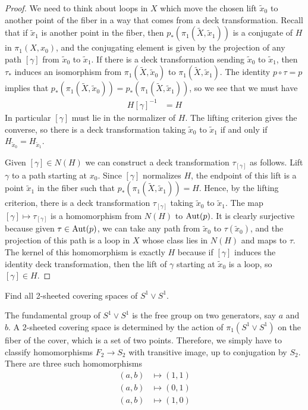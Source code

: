 \documentclass[12pt]{article}
\begin{document}
\begin{proof}
    We need to think about loops in $X$ which move the chosen lift $\widetilde x_0$ to another point of the fiber in a way that comes from a deck transformation. Recall that if $\widetilde x_1$ is another point in the fiber, then $p_*(\pi_1(\tilde X,\tilde x_1))$ is a conjugate of $H$ in $\pi_1(X,x_0)$, and the conjugating element is given by the projection of any path $[\gamma]$ from $\widetilde x_0$ to $\widetilde x_1$. If there is a deck transformation sending $\widetilde x_0$ to $\widetilde x_1$, then $\tau_*$ induces an isomorphism from $\pi_1(\tilde X,\tilde x_0)$ to $\pi_1(\tilde X,\tilde x_1)$. The identity $p\circ \tau = p$ implies that $p_*(\pi_1(\tilde X,\tilde x_0))=p_*(\pi_1(\tilde X,\tilde x_1))$, so we see that we must have \begin{align*}
        [\gamma]H[\gamma]^{-1} & = H
    \end{align*} In particular $[\gamma]$ must lie in the normalizer of $H$. The lifting criterion gives the converse, so there is a deck transformation taking $\widetilde x_0$ to $\widetilde x_1$ if and only if
    $H_{\widetilde x_0}=H_{\widetilde x_1}$.


    Given $[\gamma]\in N(H)$ we can construct a deck transformation $\tau_{[\gamma]}$ as follows. Lift $\gamma$ to a path starting at $x_0$. Since $[\gamma]$ normalizes $H$, the endpoint of this lift is a point $\widetilde x_1$ in the fiber such that $p_*(\pi_1(\tilde X,\tilde x_1))=H$. Hence, by the lifting criterion, there is a deck transformation $\tau_{[\gamma]}$ taking $\widetilde x_0$ to $\widetilde x_1$. The map $[\gamma]\mapsto \tau_{[\gamma]}$ is a homomorphism from $N(H)$ to $\operatorname{Aut}(p)$. It is clearly surjective because given $\tau \in \operatorname{Aut}(p)$, we can take any path from $\widetilde x_0$ to $\tau(\widetilde x_0)$, and the projection of this path is a loop in $X$ whose class lies in $N(H)$ and maps to $\tau$. The kernel of this homomorphism is exactly $H$ because if $[\gamma]$ induces the identity deck transformation, then the lift of $\gamma$ starting at $\widetilde x_0$ is a loop, so $[\gamma]\in H$.
\end{proof}

\begin{exercise}
    Find all 2-sheeted covering spaces of $S^1\vee S^1$.
\end{exercise}

\begin{solution}
    The fundamental group of $S^1\vee S^1$ is the free group on two generators, say $a$ and $b$. A 2-sheeted covering space is determined by the action of $\pi_1(S^1\vee S^1)$ on the fiber of the cover, which is a set of two points. Therefore, we simply have to classify homomorphisms $F_2 \to S_2$ with transitive image, up to conjugation by $S_2$. There are three such homomorphisms \begin{align*}
        (a,b) & \mapsto (1,1) \\
        (a,b) & \mapsto (0,1) \\
        (a,b) & \mapsto (1,0)
    \end{align*}
\end{solution}
\end{document}
